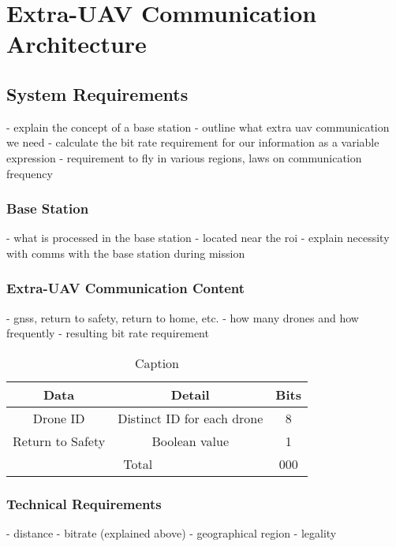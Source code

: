 \newpage
{}
\section{Extra-UAV Communication Architecture} \label{sec:extra_uav_communication}

\subsection{System Requirements}
\label{sec:euc_requirements}

- explain the concept of a base station
- outline what extra uav communication we need
- calculate the bit rate requirement for our information as a variable expression
- requirement to fly in various regions, laws on communication frequency

\subsubsection{Base Station}
- what is processed in the base station
- located near the roi
- explain necessity with comms with the base station during mission 

\subsubsection{Extra-UAV Communication Content}
- gnss, return to safety, return to home, etc.
- how many drones and how frequently
- resulting bit rate requirement


\begin{table}
    \centering
    \begin{tabular}{|c|c|c|}
        \hline Data & Detail & Bits \\
        \hline 
        \hline Drone ID & Distinct ID for each drone & 8 \\
        \hline Return to Safety & Boolean value & 1 \\
        \hline 
        \hline \multicolumn{2}{|c|}{Total} & 000 \\
        \hline 
    \end{tabular}
    \caption{Caption}
    \label{tab:my_label}
\end{table}

\subsubsection{Technical Requirements}
- distance
- bitrate (explained above)
- geographical region
- legality

